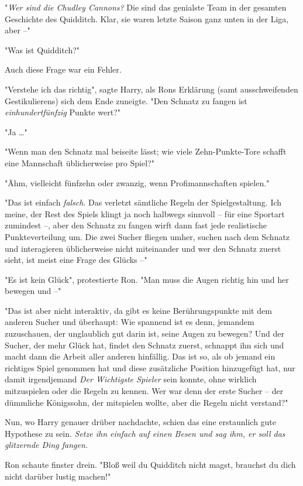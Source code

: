 {"\emph{Wer sind die Chudley Cannons?} Die sind das genialste Team in der gesamten Geschichte des Quidditch. Klar, sie waren letzte Saison ganz unten in der Liga, aber --"

"Was ist Quidditch?"

Auch diese Frage war ein Fehler.

"Verstehe ich das richtig", sagte Harry, als Rons Erklärung (samt ausschweifenden Gestikulierens) sich dem Ende zuneigte. "Den Schnatz zu fangen ist \emph{einhundertfünfzig} Punkte wert?"

"Ja …"

"Wenn man den Schnatz mal beiseite lässt; wie viele Zehn-Punkte-Tore schafft eine Mannschaft üblicherweise pro Spiel?"

"Ähm, vielleicht fünfzehn oder zwanzig, wenn Profimannschaften spielen."

"Das ist einfach \emph{falsch}. Das verletzt sämtliche Regeln der Spielgestaltung. Ich meine, der Rest des Spiels klingt ja noch halbwegs sinnvoll -- für eine Sportart zumindest --, aber den Schnatz zu fangen wirft dann fast jede realistische Punkteverteilung um. Die zwei Sucher fliegen umher, suchen nach dem Schnatz und interagieren üblicherweise nicht miteinander und wer den Schnatz zuerst sieht, ist meist eine Frage des Glücks --"

"Es ist kein Glück", protestierte Ron. "Man muss die Augen richtig hin und her bewegen und --"

"Das ist aber nicht interaktiv, da gibt es keine Berührungspunkte mit dem anderen Sucher und überhaupt: Wie spannend ist es denn, jemandem zuzuschauen, der unglaublich gut darin ist, seine Augen zu bewegen? Und der Sucher, der mehr Glück hat, findet den Schnatz zuerst, schnappt ihn sich und macht dann die Arbeit aller anderen hinfällig. Das ist so, als ob jemand ein richtiges Spiel genommen hat und diese zusätzliche Position hinzugefügt hat, nur damit irgendjemand \emph{Der Wichtigste Spieler} sein konnte, ohne wirklich mitzuspielen oder die Regeln zu kennen. Wer war denn der erste Sucher -- der dümmliche Königssohn, der mitspielen wollte, aber die Regeln nicht verstand?"

Nun, wo Harry genauer drüber nachdachte, schien das eine erstaunlich gute Hypothese zu sein. \emph{Setze ihn einfach auf einen Besen und sag ihm, er soll das glitzernde Ding fangen.}

Ron schaute finster drein. "Bloß weil du Quidditch nicht magst, brauchst du dich nicht darüber lustig machen!"

}

